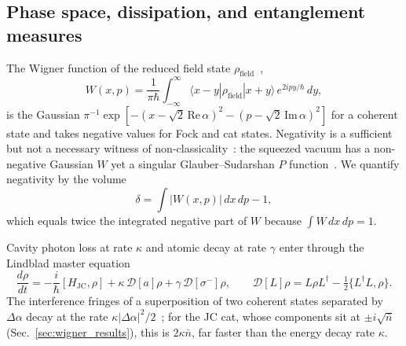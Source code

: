 \documentclass{iopjournal}
\begin{document}
\subsection{Phase space, dissipation, and entanglement measures}
\label{sec:lindblad}
The Wigner function of the reduced field state $\rho_{\text{field}}$~\cite{wigner1932},
\begin{equation}
W(x, p) = \frac{1}{\pi\hbar}\int_{-\infty}^{\infty} \langle x - y | \rho_{\text{field}} | x + y \rangle\, e^{2ipy/\hbar}\, dy,
\label{eq:wigner_def}
\end{equation}
is the Gaussian $\pi^{-1}\exp[-(x - \sqrt{2}\,\text{Re}\,\alpha)^2 - (p - \sqrt{2}\,\text{Im}\,\alpha)^2]$ for a coherent state and takes negative values for Fock and cat states. Negativity is a sufficient but not a necessary witness of non-classicality~\cite{hudson1974}: the squeezed vacuum has a non-negative Gaussian $W$ yet a singular Glauber--Sudarshan $P$ function~\cite{glauber1963, sudarshan1963}. We quantify negativity by the volume~\cite{kenfack2004}
\begin{equation}
\delta = \int \big|W(x,p)\big|\, dx\, dp - 1,
\label{eq:negativity}
\end{equation}
which equals twice the integrated negative part of $W$ because $\int W\,dx\,dp = 1$.

Cavity photon loss at rate $\kappa$ and atomic decay at rate $\gamma$ enter through the Lindblad master equation~\cite{lindblad1976, wiseman2009}
\begin{equation}
\frac{d\rho}{dt} = -\frac{i}{\hbar}[H_{\text{JC}}, \rho] + \kappa\,\mathcal{D}[a]\rho + \gamma\,\mathcal{D}[\sigma^-]\rho, \qquad \mathcal{D}[L]\rho = L\rho L^\dagger - \tfrac{1}{2}\{L^\dagger L, \rho\}.
\label{eq:lindblad}
\end{equation}
The interference fringes of a superposition of two coherent states separated by $\Delta\alpha$ decay at the rate $\kappa|\Delta\alpha|^2/2$~\cite{zurek2003, haroche2006}; for the JC cat, whose components sit at $\pm i\sqrt{\bar{n}}$ (Sec.~\ref{sec:wigner_results}), this is $2\kappa\bar{n}$, far faster than the energy decay rate $\kappa$.
\end{document}
